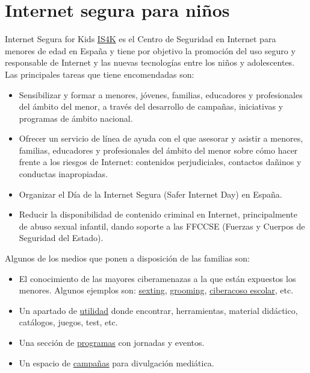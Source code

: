 \documentclass[
  a4paper,
  openany]{book}
\begin{document}
\hypertarget{internet-segura-para-niuxf1os}{%
\section{Internet segura para niños}\label{internet-segura-para-niuxf1os}}

Internet Segura for Kids \href{https://www.is4k.es/}{IS4K} es el Centro de Seguridad en Internet para menores de edad en España y tiene por objetivo la promoción del uso seguro y responsable de Internet y las nuevas tecnologías entre los niños y adolescentes. Las principales tareas que tiene encomendadas son:

\begin{itemize}
\item
  Sensibilizar y formar a menores, jóvenes, familias, educadores y profesionales del ámbito del menor, a través del desarrollo de campañas, iniciativas y programas de ámbito nacional.
\item
  Ofrecer un servicio de línea de ayuda con el que asesorar y asistir a menores, familias, educadores y profesionales del ámbito del menor sobre cómo hacer frente a los riesgos de Internet: contenidos perjudiciales, contactos dañinos y conductas inapropiadas.
\item
  Organizar el Día de la Internet Segura (Safer Internet Day) en España.
\item
  Reducir la disponibilidad de contenido criminal en Internet, principalmente de abuso sexual infantil, dando soporte a las FFCCSE (Fuerzas y Cuerpos de Seguridad del Estado).
\end{itemize}

Algunos de los medios que ponen a disposición de las familias son:

\begin{itemize}
\item
  El conocimiento de las mayores ciberamenazas a la que están expuestos los menores. Algunos ejemplos son: \href{https://www.is4k.es/necesitas-saber/sexting}{sexting}, \href{https://www.is4k.es/necesitas-saber/grooming}{grooming}, \href{https://www.is4k.es/necesitas-saber/ciberacoso-escolar}{ciberacoso escolar}, etc.
\item
  Un apartado de \href{https://www.is4k.es/de-utilidad}{utilidad} donde encontrar, herramientas, material didáctico, catálogos, juegos, test, etc.
\item
  Una sección de \href{https://www.is4k.es/programas}{programas} con jornadas y eventos.
\item
  Un espacio de \href{https://www.is4k.es/campanas}{campañas} para divulgación mediática.
\end{itemize}
\end{document}
